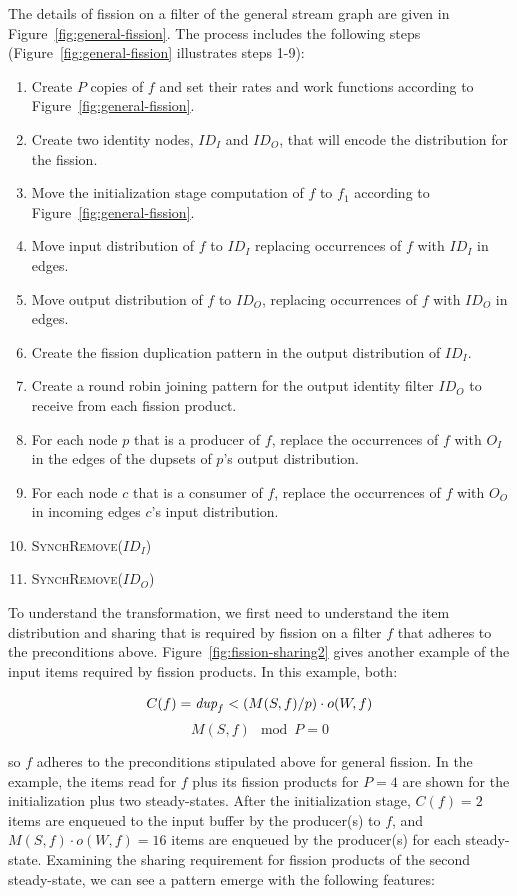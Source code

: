 The details of fission on a filter of the general stream graph are
given in Figure~\ref{fig:general-fission}.  The process includes the
following steps (Figure~\ref{fig:general-fission} illustrates steps
1-9): 
\begin{enumerate}
\item Create $P$ copies of $f$ and set their rates
and work functions according to Figure~\ref{fig:general-fission}.
\item Create two identity nodes, $ID_I$ and $ID_O$, that will encode
  the distribution for the fission.
\item Move the initialization stage computation of $f$ to $f_1$
  according to Figure~\ref{fig:general-fission}. 
\item Move input distribution of $f$ to $ID_I$
replacing occurrences of $f$ with $ID_I$ in edges.
\item Move output distribution of $f$ to $ID_O$, replacing
occurrences of $f$ with $ID_O$ in edges.
\item Create the fission duplication pattern in the
output distribution of $ID_I$.
\item Create a round robin joining pattern for the output identity
  filter $ID_O$ to receive from each fission product.
\item For each node $p$ that is a producer of $f$, replace the
 occurrences of $f$ with $O_I$ in the edges of the dupsets of $p$'s
 output distribution.
\item For each node $c$ that is a consumer of $f$, replace the
 occurrences of $f$ with $O_O$ in incoming edges $c$'s input
 distribution.
\item \textsc{SynchRemove}($ID_I$)
\item \textsc{SynchRemove}($ID_O$)
\end{enumerate}

To understand the transformation, we first need to understand the item
distribution and sharing that is required by fission on a filter $f$
that adheres to the preconditions above.
Figure~\ref{fig:fission-sharing2} gives another example of the input
items required by fission products.  In this example, both:

\[ C(f) = \mbox{\it dup}_f < (M(S,f) / p) \cdot o(W, f) \]
\[ M(S, f) \mod P = 0\]

\noindent so $f$ adheres to the preconditions stipulated above for
general fission.  In the example, the items read for $f$ plus its
fission products for $P=4$ are shown for the initialization plus two
steady-states.  After the initialization stage, $C(f) = 2$ items are
enqueued to the input buffer by the producer(s) to $f$, and $M(S,f)
\cdot o(W, f) = 16$ items are enqueued by the producer(s) for each
steady-state.  Examining the sharing requirement for fission products of
the second steady-state, we can see a pattern emerge with the following
features:

